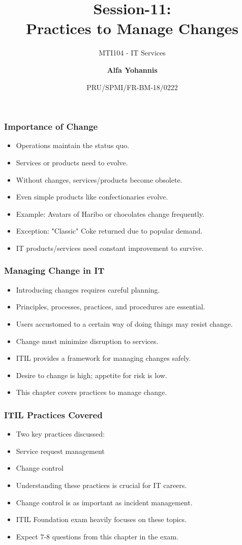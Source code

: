 \documentclass[aspectratio=169, table]{beamer}
\subtitle{MTI104 - IT Services}
\title{Session-11:\\\LARGE{Practices to Manage Changes\\}}
\date[Serial]{\scriptsize {PRU/SPMI/FR-BM-18/0222}}
\author[Pradita]{\small{\textbf{Alfa Yohannis}}}
\begin{document}
\frame{\titlepage}

\begin{frame}
	\frametitle{Importance of Change}
	\begin{itemize}
		\item Operations maintain the status quo.
		\item Services or products need to evolve.
		\item Without changes, services/products become obsolete.
		\item Even simple products like confectionaries evolve.
		\item Example: Avatars of Haribo or chocolates change frequently.
		\item Exception: "Classic" Coke returned due to popular demand.
		\item IT products/services need constant improvement to survive.
	\end{itemize}
\end{frame}

\begin{frame}
	\frametitle{Managing Change in IT}
	\begin{itemize}
		\item Introducing changes requires careful planning.
		\item Principles, processes, practices, and procedures are essential.
		\item Users accustomed to a certain way of doing things may resist change.
		\item Change must minimize disruption to services.
		\item ITIL provides a framework for managing changes safely.
		\item Desire to change is high; appetite for risk is low.
		\item This chapter covers practices to manage change.
	\end{itemize}
\end{frame}

\begin{frame}
	\frametitle{ITIL Practices Covered}
	\begin{itemize}
		\item Two key practices discussed:
		\item Service request management
		\item Change control
		\item Understanding these practices is crucial for IT careers.
		\item Change control is as important as incident management.
		\item ITIL Foundation exam heavily focuses on these topics.
		\item Expect 7-8 questions from this chapter in the exam.
	\end{itemize}
\end{frame}
\end{document}
